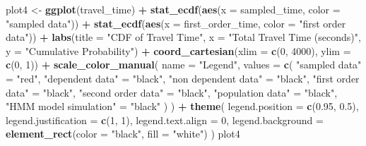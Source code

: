 \documentclass[
]{article}
\newenvironment{Shaded}{\begin{snugshade}}{\end{snugshade}}
\newcommand{\AttributeTok}[1]{\textcolor[rgb]{0.13,0.29,0.53}{#1}}
\newcommand{\DecValTok}[1]{\textcolor[rgb]{0.00,0.00,0.81}{#1}}
\newcommand{\FloatTok}[1]{\textcolor[rgb]{0.00,0.00,0.81}{#1}}
\newcommand{\FunctionTok}[1]{\textcolor[rgb]{0.13,0.29,0.53}{\textbf{#1}}}
\newcommand{\NormalTok}[1]{#1}
\newcommand{\OtherTok}[1]{\textcolor[rgb]{0.56,0.35,0.01}{#1}}
\newcommand{\SpecialCharTok}[1]{\textcolor[rgb]{0.81,0.36,0.00}{\textbf{#1}}}
\newcommand{\StringTok}[1]{\textcolor[rgb]{0.31,0.60,0.02}{#1}}
\begin{document}
\begin{Shaded}
\begin{Highlighting}[]
\NormalTok{plot4 }\OtherTok{\textless{}{-}} \FunctionTok{ggplot}\NormalTok{(travel\_time) }\SpecialCharTok{+}
  \FunctionTok{stat\_ecdf}\NormalTok{(}\FunctionTok{aes}\NormalTok{(}\AttributeTok{x =}\NormalTok{ sampled\_time, }\AttributeTok{color =} \StringTok{"sampled data"}\NormalTok{)) }\SpecialCharTok{+}
  \FunctionTok{stat\_ecdf}\NormalTok{(}\FunctionTok{aes}\NormalTok{(}\AttributeTok{x =}\NormalTok{ first\_order\_time, }\AttributeTok{color =} \StringTok{"first order data"}\NormalTok{)) }\SpecialCharTok{+}
  \FunctionTok{labs}\NormalTok{(}\AttributeTok{title =} \StringTok{"CDF of Travel Time"}\NormalTok{, }\AttributeTok{x =} \StringTok{"Total Travel Time (seconds)"}\NormalTok{, }\AttributeTok{y =} \StringTok{"Cumulative Probability"}\NormalTok{) }\SpecialCharTok{+}
  \FunctionTok{coord\_cartesian}\NormalTok{(}\AttributeTok{xlim =} \FunctionTok{c}\NormalTok{(}\DecValTok{0}\NormalTok{, }\DecValTok{4000}\NormalTok{), }\AttributeTok{ylim =} \FunctionTok{c}\NormalTok{(}\DecValTok{0}\NormalTok{, }\DecValTok{1}\NormalTok{)) }\SpecialCharTok{+}
  \FunctionTok{scale\_color\_manual}\NormalTok{(}
    \AttributeTok{name =} \StringTok{"Legend"}\NormalTok{,}
    \AttributeTok{values =} \FunctionTok{c}\NormalTok{(}
      \StringTok{"sampled data"} \OtherTok{=} \StringTok{"red"}\NormalTok{,}
      \StringTok{"dependent data"} \OtherTok{=} \StringTok{"black"}\NormalTok{,}
      \StringTok{"non dependent data"} \OtherTok{=} \StringTok{"black"}\NormalTok{,}
      \StringTok{"first order data"} \OtherTok{=} \StringTok{"black"}\NormalTok{,}
      \StringTok{"second order data"} \OtherTok{=} \StringTok{"black"}\NormalTok{,}
      \StringTok{"population data"} \OtherTok{=} \StringTok{"black"}\NormalTok{,}
      \StringTok{"HMM model simulation"} \OtherTok{=} \StringTok{"black"}
\NormalTok{    )}
\NormalTok{  ) }\SpecialCharTok{+}
  \FunctionTok{theme}\NormalTok{(}
    \AttributeTok{legend.position =} \FunctionTok{c}\NormalTok{(}\FloatTok{0.95}\NormalTok{, }\FloatTok{0.5}\NormalTok{),}
    \AttributeTok{legend.justification =} \FunctionTok{c}\NormalTok{(}\DecValTok{1}\NormalTok{, }\DecValTok{1}\NormalTok{),}
    \AttributeTok{legend.text.align =} \DecValTok{0}\NormalTok{,}
    \AttributeTok{legend.background =} \FunctionTok{element\_rect}\NormalTok{(}\AttributeTok{color =} \StringTok{"black"}\NormalTok{, }\AttributeTok{fill =} \StringTok{"white"}\NormalTok{)}
\NormalTok{  )}
\NormalTok{plot4}
\end{Highlighting}
\end{Shaded}
\end{document}
